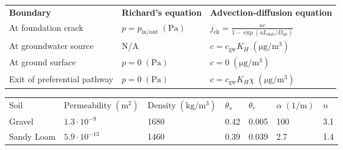 \documentclass[journal=esthag,manuscript=article]{achemso}
\begin{document}
\begin{table}[htb!]
 \begin{tabular}{l l l}
  \toprule
  \textbf{Boundary}            & \textbf{Richard's equation}              & \textbf{Advection-diffusion equation}                                      \\
  At foundation crack          & $p = p_\mathrm{in/out} \; \mathrm{(Pa)}$ & $j_\mathrm{ck} = \frac{u c}{1 - \exp{(u L_\mathrm{slab}/D_\mathrm{air})}}$ \\
  At groundwater source        & N/A                                      & $c = c_\mathrm{gw} K_H \; \mathrm{(\mu g/m^3)}$                            \\
  At ground surface            & $p = 0 \; \mathrm{(Pa)}$                 & $c = 0 \; \mathrm{(\mu g/m^3)}$                                            \\
  Exit of preferential pathway & $p = 0 \; \mathrm{(Pa)}$                 & $c = c_\mathrm{gw} K_H \chi \; \mathrm{(\mu g/m^3)}$                       \\
  \bottomrule
 \end{tabular}
 \bigskip
 \begin{tabular}{l l l l l l l}
  \toprule
  Soil       & $\text{Permeability} \; \mathrm{(m^2)}$ & $\mathrm{Density} \; \mathrm{(kg/m^3)}$ & $\theta_s$ & $\theta_r$ & $\alpha \; \mathrm{(1/m)}$ & $n$ \\
  Gravel     & $1.3 \cdot 10^{-9}$                     & 1680                                    & 0.42       & 0.005      & 100                        & 3.1 \\
  Sandy Loam & $5.9 \cdot 10^{-13}$                    & 1460                                    & 0.39       & 0.039      & 2.7                        & 1.4 \\
  \bottomrule
 \end{tabular}
 \bigskip

\end{table}
\end{document}
